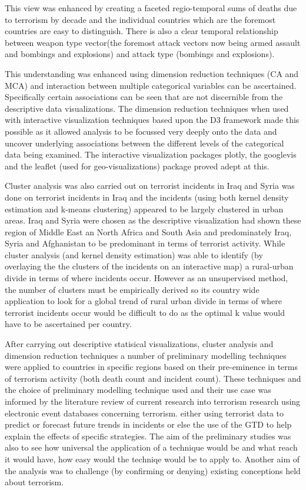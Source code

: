 This view was enhanced by creating a faceted regio-temporal sums of deaths due to terrorism by decade and the individual countries which are the foremost countries are easy to distinguish. There is also a clear temporal relationship between weapon type vector(the foremost attack vectors now being armed assault and bombings and explosions) and attack type (bombings and explosions). 

This understanding was enhanced using dimension reduction techniques (CA and MCA) and interaction between multiple categorical variables can be ascertained. Specifically certain associations can be seen that are not discernible from the descriptive data visualizations. The dimension reduction techniques when used with interactive visualization techniques based upon the D3 framework made this possible as it allowed analysis to be focussed very deeply onto the data and uncover underlying associations between the different levels of the categorical data being examined. The interactive visualization packages plotly, the googlevis and the leaflet (used for geo-visualizations) package proved adept at this.

Cluster analysis was also carried out on terrorist incidents in Iraq and Syria was done on terrorist incidents in Iraq and the incidents (using both kernel density estimation and k-means clustering) appeared to be largely clustered in urban areas. Iraq and Syria were chosen as the descriptive visualization had shown these region of Middle East an North Africa and South Asia and predominately Iraq, Syria and Afghanistan to be predominant in terms of terrorist activity. While cluster analysis (and kernel density estimation) was able to identify (by overlaying the the clusters of the incidents on an interactive map) a rural-urban divide in terms of where incidents occur. However as an unsupervised method, the number of clusters must be empirically derived so its country wide application to look for a global trend of rural urban divide in terms of where terrorist incidents occur would be difficult to do as the optimal k value would have to be ascertained per country.

After carrying out descriptive statisical visualizations, cluster analysis and dimension reduction techniques a number of preliminary modelling techniques were applied to countries in specific regions based on their pre-eminence in terms of terrorism activity (both death count and incident count). These techniques and the choice of preliminary  modelling technique used and their use case was informed by the literature review of current research into terrorism research using electronic event databases concerning terrorism. either using terrorist data to predict or forecast future trends in incidents or else the use of the GTD to help explain the effects of specific strategies. The aim of the preliminary studies  was also to see how universal the application of  a technique would be and what reach it would have, how easy would the techniqe would be to apply to. Another aim of the analysis was to challenge (by confirming or denying) existing conceptions held about terrorism.

